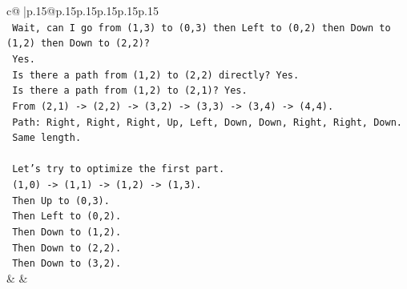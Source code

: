 \documentclass{article}
\begin{document}
{\begin{supertabular}{c@{$\;$}|p{.15\linewidth}@{}p{.15\linewidth}p{.15\linewidth}p{.15\linewidth}p{.15\linewidth}p{.15\linewidth}}
{{{\\ 
\texttt{   Wait, can I go from (1,3) to (0,3) then Left to (0,2) then Down to (1,2) then Down to (2,2)?} \\
\texttt{   Yes.} \\
\texttt{   Is there a path from (1,2) to (2,2) directly? Yes.} \\
\texttt{   Is there a path from (1,2) to (2,1)? Yes.} \\
\texttt{   From (2,1) {-}> (2,2) {-}> (3,2) {-}> (3,3) {-}> (3,4) {-}> (4,4).} \\
\texttt{   Path: Right, Right, Right, Up, Left, Down, Down, Right, Right, Down.} \\
\texttt{   Same length.} \\
\\ 
\texttt{   Let's try to optimize the first part.} \\
\texttt{   (1,0) {-}> (1,1) {-}> (1,2) {-}> (1,3).} \\
\texttt{   Then Up to (0,3).} \\
\texttt{   Then Left to (0,2).} \\
\texttt{   Then Down to (1,2).} \\
\texttt{   Then Down to (2,2).} \\
\texttt{   Then Down to (3,2).} \\
            }
        }
    }
    & & \\ \\


\end{supertabular}}
\end{document}
